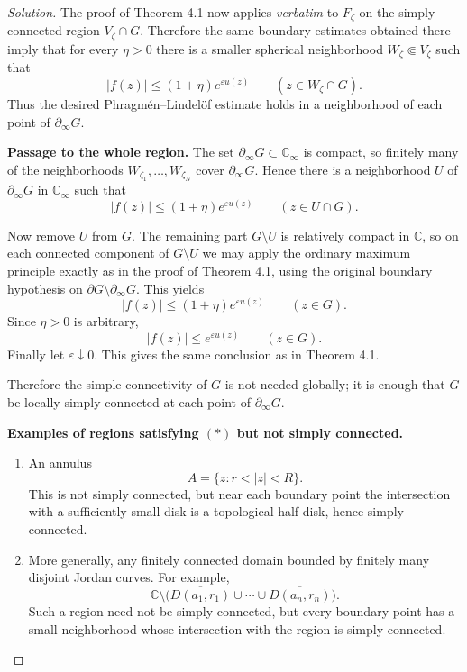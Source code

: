 \documentclass[12pt, a4paper]{report}
\theoremstyle{spaced}
\begin{document}
\begin{proof}[Solution]
	The proof of Theorem 4.1 now applies \emph{verbatim} to \(F_\zeta\) on the simply connected region \(V_\zeta\cap G\). Therefore the same boundary estimates obtained there imply that for every \(\eta>0\) there is a smaller spherical neighborhood \(W_\zeta\Subset V_\zeta\) such that
	\[
		|f(z)|\le (1+\eta)e^{\varepsilon u(z)}
		\qquad (z\in W_\zeta\cap G).
	\]
	Thus the desired Phragm\'en--Lindel\"of estimate holds in a neighborhood of each point of \(\partial_\infty G\).

	\medskip
	\textbf{Passage to the whole region.}
	The set \(\partial_\infty G\subset \mathbb C_\infty\) is compact, so finitely many of the neighborhoods \(W_{\zeta_1},\dots,W_{\zeta_N}\) cover \(\partial_\infty G\). Hence there is a neighborhood \(U\) of \(\partial_\infty G\) in \(\mathbb C_\infty\) such that
	\[
		|f(z)|\le (1+\eta)e^{\varepsilon u(z)}
		\qquad (z\in U\cap G).
	\]

	Now remove \(U\) from \(G\). The remaining part \(G\setminus U\) is relatively compact in \(\mathbb C\), so on each connected component of \(G\setminus U\) we may apply the ordinary maximum principle exactly as in the proof of Theorem 4.1, using the original boundary hypothesis on \(\partial G\setminus \partial_\infty G\). This yields
	\[
		|f(z)|\le (1+\eta)e^{\varepsilon u(z)}
		\qquad (z\in G).
	\]
	Since \(\eta>0\) is arbitrary,
	\[
		|f(z)|\le e^{\varepsilon u(z)}
		\qquad (z\in G).
	\]
	Finally let \(\varepsilon\downarrow 0\). This gives the same conclusion as in Theorem 4.1.

	Therefore the simple connectivity of \(G\) is not needed globally; it is enough that \(G\) be locally simply connected at each point of \(\partial_\infty G\).

	\medskip
	\textbf{Examples of regions satisfying \((*)\) but not simply connected.}
	\begin{enumerate}
		\item An annulus
		      \[
			      A=\{z:r<|z|<R\}.
		      \]
		      This is not simply connected, but near each boundary point the intersection with a sufficiently small disk is a topological half-disk, hence simply connected.

		\item More generally, any finitely connected domain bounded by finitely many disjoint Jordan curves.
		      For example,
		      \[
			      \mathbb C\setminus \bigl(\overline{D(a_1,r_1)}\cup \cdots \cup \overline{D(a_n,r_n)}\bigr).
		      \]
		      Such a region need not be simply connected, but every boundary point has a small neighborhood whose intersection with the region is simply connected.


\end{enumerate}
\end{proof}
\end{document}
